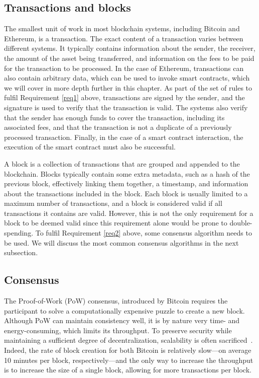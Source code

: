 \subsection{Transactions and blocks}
 The smallest unit of work in most blockchain systems, including Bitcoin and Ethereum, is a transaction.
The exact content of a transaction varies between different systems. It typically contains information about the sender, the receiver, the amount of the asset being transferred, and information on the fees to be paid for the transaction to be processed.
In the case of Ethereum, transactions can also contain arbitrary data, which can be used to invoke smart contracts, which we will cover in more depth further in this chapter.
As part of the set of rules to fulfil Requirement \ref{req1} above, transactions are signed by the sender, and the signature is used to verify that the transaction is valid.
The systems also verify that the sender has enough funds to cover the transaction, including its associated fees, and that the transaction is not a duplicate of a previously processed transaction.
Finally, in the case of a smart contract interaction, the execution of the smart contract must also be successful.

A block is a collection of transactions that are grouped and appended to the blockchain.
Blocks typically contain some extra metadata, such as a hash of the previous block, effectively linking them together, a timestamp, and information about the transactions included in the block.
Each block is usually limited to a maximum number of transactions, and a block is considered valid if all transactions it contains are valid.
However, this is not the only requirement for a block to be deemed valid since this requirement alone would be prone to double-spending.
To fulfil Requirement \ref{req2} above, some consensus algorithm needs to be used.
We will discuss the most common consensus algorithms in the next subsection.

\subsection{Consensus}
The Proof-of-Work (PoW) consensus, introduced by Bitcoin requires the participant to solve a computationally expensive puzzle to create a new block. Although PoW can maintain consistency well, it is by nature very time- and energy-consuming, which limits its throughput.
To preserve security while maintaining a sufficient degree of decentralization, scalability is often sacrificed~\cite{Xie2019}.
Indeed, the rate of block creation for both Bitcoin is relatively slow---on average 10 minutes per block, respectively---and the only way to increase the throughput is to increase the size of a single block, allowing for more transactions per block.

